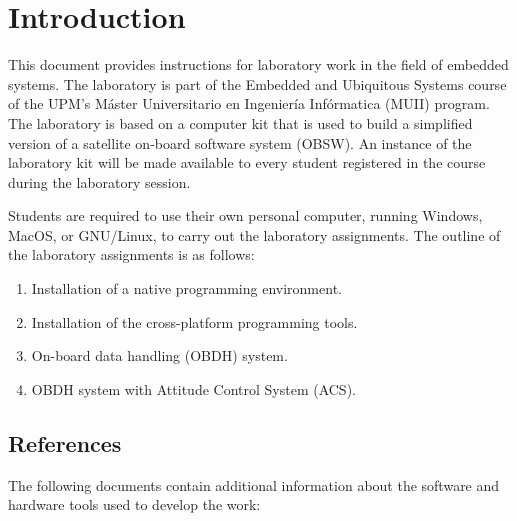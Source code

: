 \chapter*{Introduction}\label{ch:introduction}

This document provides instructions for laboratory work in the field of embedded systems. The laboratory is part of the Embedded and Ubiquitous Systems course of the UPM's Máster Universitario en Ingeniería Infórmatica (MUII) program.
The laboratory is based on a computer kit that is used to build a simplified version of a satellite on-board software system (OBSW). An instance of the laboratory kit will be made available to every student registered in the course during the laboratory session.

Students are required to use their own personal computer, running Windows, MacOS, or GNU/Linux, to carry out the laboratory assignments. 
The outline of the laboratory assignments is as follows:
\begin{enumerate}
\item	Installation of a native programming environment.
\item	Installation of the cross-platform programming tools.
\item   On-board data handling (OBDH) system.
\item   OBDH system with Attitude Control System (ACS).
\end{enumerate}

\section*{References}

The following documents contain additional information about the software
and hardware tools used to develop the work:

